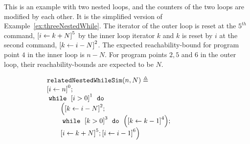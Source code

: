 \begin{example}
  \label{ex:relatedNestedWhileSim}
This is an example with two nested loops, and the counters of the two loops are
modified by each other. It is the simplified version of Example~\ref{ex:threeNestedWhile}.
The iterator of the outer loop is reset at the $5^{th}$ command, $\clabel{\assign{i}{k + N}}^{5}$ by the inner loop iterator $k$ and $k$ is reset by $i$ at the second command, $\clabel{\assign{k}{i - N}}^{2}$.
The expected reachability-bound for
program point $4$ in the inner loop is $n - N$.
For program points $2, 5$ and $6$ in the outer loop, their reachability-bounds are expected to be $N$.

  { \small
\begin{figure}
\centering
\begin{subfigure}{.4\textwidth}
  \begin{centering}
  {\small
  $
  \begin{array}{l}
      \kw{relatedNestedWhileSim}(n, N) \triangleq \\
      \clabel{ \assign{i}{n} }^{0} ; \\
          \ewhile ~ \clabel{i > 0}^{1} ~ \edo ~ \\
          \qquad \Big(
            \clabel{\assign{k}{i - N}}^{2};\\
            \qquad \ewhile ~ \clabel{k > 0}^{3} ~ \edo ~
                \Big(
                \clabel{\assign{k}{k - 1}}^{4}
                \Big); 
                \\
                \qquad \clabel{\assign{i}{k + N}}^{5};
                \clabel{\assign{i}{i-1}}^{6}
            \Big)
      \end{array}
  $
  }
  \caption{}
  \end{centering}
  \end{subfigure}
\begin{subfigure}{.55\textwidth}
  \begin{centering}
\end{centering}
\end{subfigure}
\end{figure}}
\end{example}
